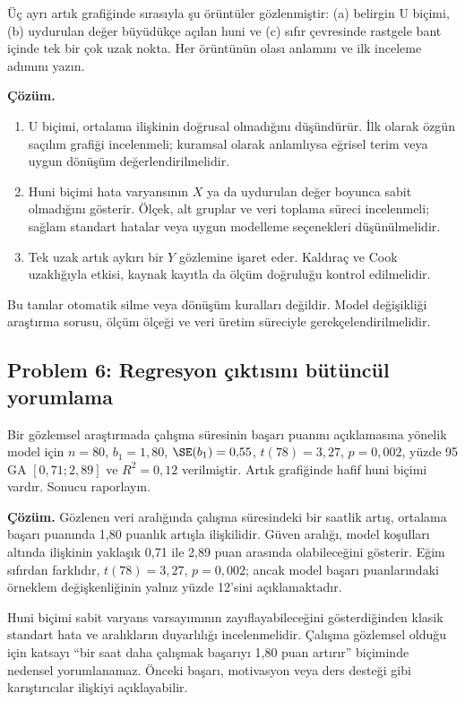 Üç ayrı artık grafiğinde sırasıyla şu örüntüler gözlenmiştir: (a) belirgin U
biçimi, (b) uydurulan değer büyüdükçe açılan huni ve (c) sıfır çevresinde
rastgele bant içinde tek bir çok uzak nokta. Her örüntünün olası anlamını ve
ilk inceleme adımını yazın.

\textbf{Çözüm.}

\begin{enumerate}[label=\alph*)]
  \item U biçimi, ortalama ilişkinin doğrusal olmadığını düşündürür. İlk olarak
  özgün saçılım grafiği incelenmeli; kuramsal olarak anlamlıysa eğrisel terim
  veya uygun dönüşüm değerlendirilmelidir.
  \item Huni biçimi hata varyansının $X$ ya da uydurulan değer boyunca sabit
  olmadığını gösterir. Ölçek, alt gruplar ve veri toplama süreci incelenmeli;
  sağlam standart hatalar veya uygun modelleme seçenekleri düşünülmelidir.
  \item Tek uzak artık aykırı bir $Y$ gözlemine işaret eder. Kaldıraç ve Cook
  uzaklığıyla etkisi, kaynak kayıtla da ölçüm doğruluğu kontrol edilmelidir.
\end{enumerate}

Bu tanılar otomatik silme veya dönüşüm kuralları değildir. Model değişikliği
araştırma sorusu, ölçüm ölçeği ve veri üretim süreciyle gerekçelendirilmelidir.

\subsection*{Problem 6: Regresyon çıktısını bütüncül yorumlama}

Bir gözlemsel araştırmada çalışma süresinin başarı puanını açıklamasına yönelik
model için $n=80$, $b_1=1{,}80$, $\SE(b_1)=0{,}55$,
$t(78)=3{,}27$, $p=0{,}002$, yüzde 95 GA $[0{,}71;2{,}89]$ ve
$R^2=0{,}12$ verilmiştir. Artık grafiğinde hafif huni biçimi vardır. Sonucu
raporlayın.

\textbf{Çözüm.} Gözlenen veri aralığında çalışma süresindeki bir saatlik
artış, ortalama başarı puanında 1,80 puanlık artışla ilişkilidir. Güven
aralığı, model koşulları altında ilişkinin yaklaşık 0,71 ile 2,89 puan
arasında olabileceğini gösterir. Eğim sıfırdan farklıdır,
$t(78)=3{,}27$, $p=0{,}002$; ancak model başarı puanlarındaki örneklem
değişkenliğinin yalnız yüzde 12'sini açıklamaktadır.

Huni biçimi sabit varyans varsayımının zayıflayabileceğini gösterdiğinden
klasik standart hata ve aralıkların duyarlılığı incelenmelidir. Çalışma
gözlemsel olduğu için katsayı ``bir saat daha çalışmak başarıyı 1,80 puan
artırır'' biçiminde nedensel yorumlanamaz. Önceki başarı, motivasyon veya ders
desteği gibi karıştırıcılar ilişkiyi açıklayabilir.

